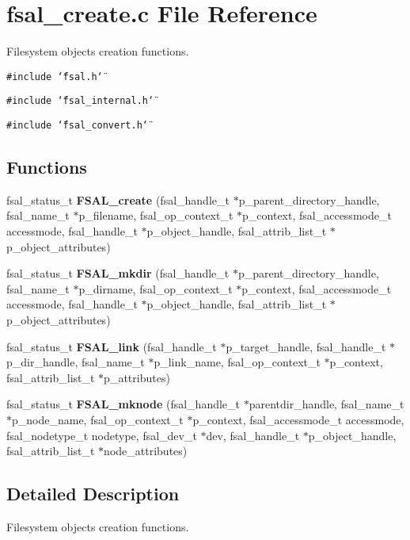 \section{fsal\_\-create.c File Reference}
\label{fsal__create_8c}
Filesystem objects creation functions. 

{\tt \#include \char`\"{}fsal.h\char`\"{}}\par
{\tt \#include \char`\"{}fsal\_\-internal.h\char`\"{}}\par
{\tt \#include \char`\"{}fsal\_\-convert.h\char`\"{}}\par
\subsection*{Functions}
\begin{CompactItemize}
\item 
fsal\_\-status\_\-t {\bf FSAL\_\-create} (fsal\_\-handle\_\-t $\ast$p\_\-parent\_\-directory\_\-handle, fsal\_\-name\_\-t $\ast$p\_\-filename, fsal\_\-op\_\-context\_\-t $\ast$p\_\-context, fsal\_\-accessmode\_\-t accessmode, fsal\_\-handle\_\-t $\ast$p\_\-object\_\-handle, fsal\_\-attrib\_\-list\_\-t $\ast$p\_\-object\_\-attributes)
\item 
fsal\_\-status\_\-t {\bf FSAL\_\-mkdir} (fsal\_\-handle\_\-t $\ast$p\_\-parent\_\-directory\_\-handle, fsal\_\-name\_\-t $\ast$p\_\-dirname, fsal\_\-op\_\-context\_\-t $\ast$p\_\-context, fsal\_\-accessmode\_\-t accessmode, fsal\_\-handle\_\-t $\ast$p\_\-object\_\-handle, fsal\_\-attrib\_\-list\_\-t $\ast$p\_\-object\_\-attributes)
\item 
fsal\_\-status\_\-t {\bf FSAL\_\-link} (fsal\_\-handle\_\-t $\ast$p\_\-target\_\-handle, fsal\_\-handle\_\-t $\ast$p\_\-dir\_\-handle, fsal\_\-name\_\-t $\ast$p\_\-link\_\-name, fsal\_\-op\_\-context\_\-t $\ast$p\_\-context, fsal\_\-attrib\_\-list\_\-t $\ast$p\_\-attributes)
\item 
fsal\_\-status\_\-t {\bf FSAL\_\-mknode} (fsal\_\-handle\_\-t $\ast$parentdir\_\-handle, fsal\_\-name\_\-t $\ast$p\_\-node\_\-name, fsal\_\-op\_\-context\_\-t $\ast$p\_\-context, fsal\_\-accessmode\_\-t accessmode, fsal\_\-nodetype\_\-t nodetype, fsal\_\-dev\_\-t $\ast$dev, fsal\_\-handle\_\-t $\ast$p\_\-object\_\-handle, fsal\_\-attrib\_\-list\_\-t $\ast$node\_\-attributes)
\end{CompactItemize}


\subsection{Detailed Description}
Filesystem objects creation functions. 

